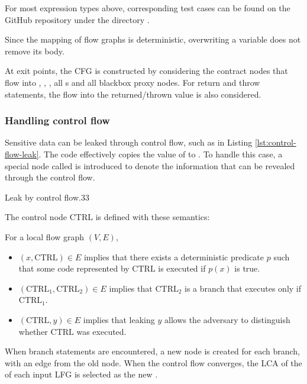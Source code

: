 For most expression types above, corresponding test cases can be found on the
GitHub repository under the directory .

Since the mapping of flow graphs is deterministic,
overwriting a variable does not remove its body.

At exit points, the \ac{CFG} is constructed by considering the contract nodes
that flow into , , ,
all s and all blackbox proxy nodes.
For return and throw statements,
the flow into the returned/thrown value is also considered.

\subsubsection{Handling control flow}\label{subsubsec:control}
Sensitive data can be leaked through control flow,
such as in Listing \ref{lst:control-flow-leak}.
The code effectively copies the value of  to .
To handle this case,
a special node called  is introduced
to denote the information that can be revealed through the control flow.

{Leak by control flow}{.3}3

The control node $\mathrm{CTRL}$ is defined with these semantics:

\begin{defin}
  For a local flow graph $(V, E)$, \begin{itemize}
    \item $(x, \mathrm{CTRL}) \in E$ implies that
      there exists a deterministic predicate $p$
      such that some code represented by $\mathrm{CTRL}$
      is executed if $p(x)$ is true.
    \item $(\mathrm{CTRL}_1, \mathrm{CTRL}_2) \in E$ implies that
      $\mathrm{CTRL}_2$ is a branch that executes only if $\mathrm{CTRL}_1$.
    \item $(\mathrm{CTRL}, y) \in E$ implies that
      leaking $y$ allows the adversary to distinguish whether $\mathrm{CTRL}$ was executed.
  \end{itemize}
\end{defin}

When branch statements are encountered,
a new  node is created for each branch,
with an edge from the old node.
When the control flow converges,
the \ac{LCA} of the  of each input \ac{LFG}
is selected as the new .


